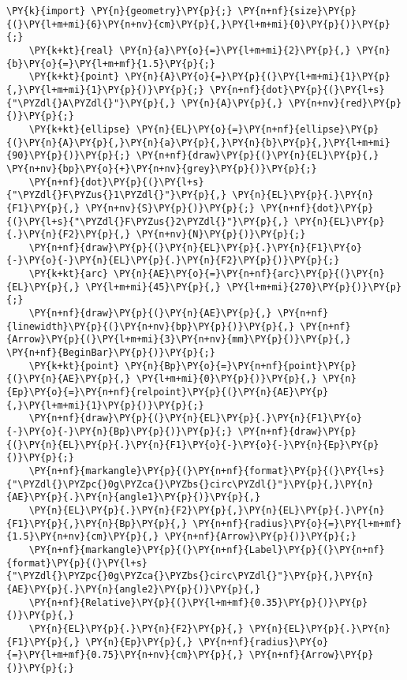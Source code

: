 \begin{Verbatim}[commandchars=\\\{\}]
    \PY{k}{import} \PY{n}{geometry}\PY{p}{;} \PY{n+nf}{size}\PY{p}{(}\PY{l+m+mi}{6}\PY{n+nv}{cm}\PY{p}{,}\PY{l+m+mi}{0}\PY{p}{)}\PY{p}{;}
    \PY{k+kt}{real} \PY{n}{a}\PY{o}{=}\PY{l+m+mi}{2}\PY{p}{,} \PY{n}{b}\PY{o}{=}\PY{l+m+mf}{1.5}\PY{p}{;}
    \PY{k+kt}{point} \PY{n}{A}\PY{o}{=}\PY{p}{(}\PY{l+m+mi}{1}\PY{p}{,}\PY{l+m+mi}{1}\PY{p}{)}\PY{p}{;} \PY{n+nf}{dot}\PY{p}{(}\PY{l+s}{"\PYZdl{}A\PYZdl{}"}\PY{p}{,} \PY{n}{A}\PY{p}{,} \PY{n+nv}{red}\PY{p}{)}\PY{p}{;}
    \PY{k+kt}{ellipse} \PY{n}{EL}\PY{o}{=}\PY{n+nf}{ellipse}\PY{p}{(}\PY{n}{A}\PY{p}{,}\PY{n}{a}\PY{p}{,}\PY{n}{b}\PY{p}{,}\PY{l+m+mi}{90}\PY{p}{)}\PY{p}{;} \PY{n+nf}{draw}\PY{p}{(}\PY{n}{EL}\PY{p}{,} \PY{n+nv}{bp}\PY{o}{+}\PY{n+nv}{grey}\PY{p}{)}\PY{p}{;}
    \PY{n+nf}{dot}\PY{p}{(}\PY{l+s}{"\PYZdl{}F\PYZus{}1\PYZdl{}"}\PY{p}{,} \PY{n}{EL}\PY{p}{.}\PY{n}{F1}\PY{p}{,} \PY{n+nv}{S}\PY{p}{)}\PY{p}{;} \PY{n+nf}{dot}\PY{p}{(}\PY{l+s}{"\PYZdl{}F\PYZus{}2\PYZdl{}"}\PY{p}{,} \PY{n}{EL}\PY{p}{.}\PY{n}{F2}\PY{p}{,} \PY{n+nv}{N}\PY{p}{)}\PY{p}{;}
    \PY{n+nf}{draw}\PY{p}{(}\PY{n}{EL}\PY{p}{.}\PY{n}{F1}\PY{o}{-}\PY{o}{-}\PY{n}{EL}\PY{p}{.}\PY{n}{F2}\PY{p}{)}\PY{p}{;}
    \PY{k+kt}{arc} \PY{n}{AE}\PY{o}{=}\PY{n+nf}{arc}\PY{p}{(}\PY{n}{EL}\PY{p}{,} \PY{l+m+mi}{45}\PY{p}{,} \PY{l+m+mi}{270}\PY{p}{)}\PY{p}{;}
    \PY{n+nf}{draw}\PY{p}{(}\PY{n}{AE}\PY{p}{,} \PY{n+nf}{linewidth}\PY{p}{(}\PY{n+nv}{bp}\PY{p}{)}\PY{p}{,} \PY{n+nf}{Arrow}\PY{p}{(}\PY{l+m+mi}{3}\PY{n+nv}{mm}\PY{p}{)}\PY{p}{,} \PY{n+nf}{BeginBar}\PY{p}{)}\PY{p}{;}
    \PY{k+kt}{point} \PY{n}{Bp}\PY{o}{=}\PY{n+nf}{point}\PY{p}{(}\PY{n}{AE}\PY{p}{,} \PY{l+m+mi}{0}\PY{p}{)}\PY{p}{,} \PY{n}{Ep}\PY{o}{=}\PY{n+nf}{relpoint}\PY{p}{(}\PY{n}{AE}\PY{p}{,}\PY{l+m+mi}{1}\PY{p}{)}\PY{p}{;}
    \PY{n+nf}{draw}\PY{p}{(}\PY{n}{EL}\PY{p}{.}\PY{n}{F1}\PY{o}{-}\PY{o}{-}\PY{n}{Bp}\PY{p}{)}\PY{p}{;} \PY{n+nf}{draw}\PY{p}{(}\PY{n}{EL}\PY{p}{.}\PY{n}{F1}\PY{o}{-}\PY{o}{-}\PY{n}{Ep}\PY{p}{)}\PY{p}{;}
    \PY{n+nf}{markangle}\PY{p}{(}\PY{n+nf}{format}\PY{p}{(}\PY{l+s}{"\PYZdl{}\PYZpc{}0g\PYZca{}\PYZbs{}circ\PYZdl{}"}\PY{p}{,}\PY{n}{AE}\PY{p}{.}\PY{n}{angle1}\PY{p}{)}\PY{p}{,}
    \PY{n}{EL}\PY{p}{.}\PY{n}{F2}\PY{p}{,}\PY{n}{EL}\PY{p}{.}\PY{n}{F1}\PY{p}{,}\PY{n}{Bp}\PY{p}{,} \PY{n+nf}{radius}\PY{o}{=}\PY{l+m+mf}{1.5}\PY{n+nv}{cm}\PY{p}{,} \PY{n+nf}{Arrow}\PY{p}{)}\PY{p}{;}
    \PY{n+nf}{markangle}\PY{p}{(}\PY{n+nf}{Label}\PY{p}{(}\PY{n+nf}{format}\PY{p}{(}\PY{l+s}{"\PYZdl{}\PYZpc{}0g\PYZca{}\PYZbs{}circ\PYZdl{}"}\PY{p}{,}\PY{n}{AE}\PY{p}{.}\PY{n}{angle2}\PY{p}{)}\PY{p}{,}
    \PY{n+nf}{Relative}\PY{p}{(}\PY{l+m+mf}{0.35}\PY{p}{)}\PY{p}{)}\PY{p}{,}
    \PY{n}{EL}\PY{p}{.}\PY{n}{F2}\PY{p}{,} \PY{n}{EL}\PY{p}{.}\PY{n}{F1}\PY{p}{,} \PY{n}{Ep}\PY{p}{,} \PY{n+nf}{radius}\PY{o}{=}\PY{l+m+mf}{0.75}\PY{n+nv}{cm}\PY{p}{,} \PY{n+nf}{Arrow}\PY{p}{)}\PY{p}{;}
\end{Verbatim}
